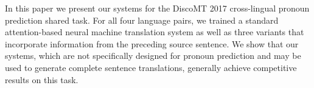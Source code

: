 In this paper we present our systems for the DiscoMT 2017 cross-lingual pronoun prediction shared task. For all four language pairs, we trained a standard attention-based neural machine translation system as well as three variants that incorporate information from the preceding source sentence. We show that our systems, which are not specifically designed for pronoun prediction and may be used to generate complete sentence translations, generally achieve competitive results on this task.
